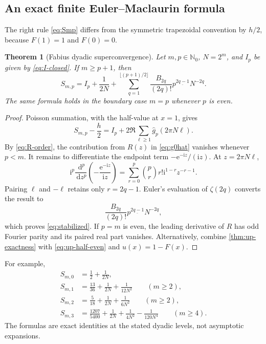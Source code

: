 \documentclass[11pt]{article}
\newtheorem{theorem}{Theorem}[section]
\theoremstyle{definition}
\theoremstyle{remark}
\newcommand{\e}{\mathrm e}
\newcommand{\ii}{\mathrm i}
\newcommand{\N}{\mathbb N}
\newcommand{\fall}[2]{#1^{\underline{#2}}}
\newcommand{\dd}{\,\mathrm d}
\begin{document}
\subsection{An exact finite Euler--Maclaurin formula}

The right rule \eqref{eq:Smp} differs from the symmetric trapezoidal convention
by $h/2$, because $F(1)=1$ and $F(0)=0$.

\begin{theorem}[Fabius dyadic superconvergence]\label{thm:superconvergence}
Let $m,p\in\N_0$, $N=2^m$, and $I_p$ be given by
\eqref{eq:I-closed}.  If $m\ge p+1$, then
\begin{equation}\label{eq:stabilized}
 \boxed{
 S_{m,p}=I_p+\frac1{2N}
 +\sum_{q=1}^{\lfloor(p+1)/2\rfloor}
   \frac{B_{2q}}{(2q)!}\fall{p}{2q-1}N^{-2q}.}
\end{equation}
The same formula holds in the boundary case $m=p$ whenever $p$ is even.
\end{theorem}

\begin{proof}
Poisson summation, with the half-value at $x=1$, gives
\[
 S_{m,p}-\frac h2
 =I_p+2\Re\sum_{\ell\ge1}\widehat g_p(2\pi N\ell).
\]
By \eqref{eq:R-order}, the contribution from $R(z)$ in
\eqref{eq:g0hat} vanishes whenever $p<m$.  It remains to differentiate the
endpoint term $-\e^{-\ii z}/(\ii z)$.  At $z=2\pi N\ell$,
\[
 \ii^p\frac{\dd^p}{\dd z^p}
 \left(-\frac{\e^{-\ii z}}{\ii z}\right)
 =\sum_{r=0}^{p}\binom pr r!\ii^{1-r}z^{-r-1}.
\]
Pairing $\ell$ and $-\ell$ retains only $r=2q-1$.  Euler's evaluation of
$\zeta(2q)$ converts the result to
\[
 \frac{B_{2q}}{(2q)!}\fall p{2q-1}N^{-2q},
\]
which proves \eqref{eq:stabilized}.  If $p=m$ is even, the leading derivative
of $R$ has odd Fourier parity and its paired real part vanishes.  Alternatively,
combine \cref{thm:up-exactness} with \eqref{eq:up-half-even} and
$u(x)=1-F(x)$.
\end{proof}

For example,
\begin{align*}
 S_{m,0}&=\frac12+\frac1{2N},\\
 S_{m,1}&=\frac{13}{36}+\frac1{2N}+\frac1{12N^2}
 \qquad(m\ge2),\\
 S_{m,2}&=\frac5{18}+\frac1{2N}+\frac1{6N^2}
 \qquad(m\ge2),\\
 S_{m,3}&=\frac{1207}{5400}+\frac1{2N}+\frac1{4N^2}
          -\frac1{120N^4}
 \qquad(m\ge4).
\end{align*}
The formulas are exact identities at the stated dyadic levels, not asymptotic
expansions.
\end{document}
